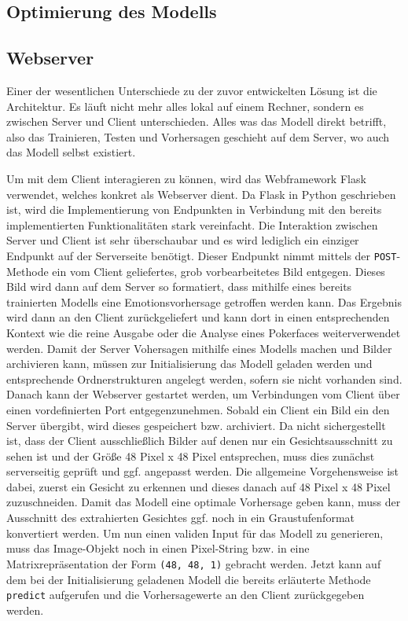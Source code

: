 \documentclass[12pt, a4paper]{report}
\begin{document}
\subsection{Optimierung des Modells}

\subsection{Webserver}
Einer der wesentlichen Unterschiede zu der zuvor entwickelten Lösung ist die Architektur. Es läuft nicht mehr alles lokal auf einem Rechner, sondern es zwischen Server und Client unterschieden. Alles was das Modell direkt betrifft, also das Trainieren, Testen und Vorhersagen geschieht auf dem Server, wo auch das Modell selbst existiert. 


Um mit dem Client interagieren zu können, wird das Webframework Flask verwendet, welches konkret als Webserver dient. Da Flask in Python geschrieben ist, wird die Implementierung von Endpunkten in Verbindung mit den bereits implementierten Funktionalitäten stark vereinfacht.\newline
Die Interaktion zwischen Server und Client ist sehr überschaubar und es wird lediglich ein einziger Endpunkt auf der Serverseite benötigt. Dieser Endpunkt nimmt mittels der \texttt{POST}-Methode ein vom Client geliefertes, grob vorbearbeitetes Bild entgegen. Dieses Bild wird dann auf dem Server so formatiert, dass mithilfe eines bereits trainierten Modells eine Emotionsvorhersage getroffen werden kann. Das Ergebnis wird dann an den Client zurückgeliefert und kann dort in einen entsprechenden Kontext wie die reine Ausgabe oder die Analyse eines Pokerfaces weiterverwendet werden.\newline
Damit der Server Vohersagen mithilfe eines Modells machen und Bilder archivieren kann, müssen zur Initialisierung das Modell geladen werden und entsprechende Ordnerstrukturen angelegt werden, sofern sie nicht vorhanden sind. Danach kann der Webserver gestartet werden, um Verbindungen vom Client über einen vordefinierten Port entgegenzunehmen. Sobald ein Client ein Bild ein den Server übergibt, wird dieses gespeichert bzw. archiviert. Da nicht sichergestellt ist, dass der Client ausschließlich Bilder auf denen nur ein Gesichtsausschnitt zu sehen ist und der Größe  48 Pixel x 48 Pixel entsprechen, muss dies zunächst serverseitig geprüft und ggf. angepasst werden.  
Die allgemeine Vorgehensweise ist dabei, zuerst ein Gesicht zu erkennen und dieses danach auf 48 Pixel x 48 Pixel zuzuschneiden. Damit das Modell eine optimale Vorhersage geben kann, muss der Ausschnitt des extrahierten Gesichtes ggf. noch in ein Graustufenformat konvertiert werden. Um nun einen validen Input für das Modell zu generieren, muss das Image-Objekt noch in einen Pixel-String bzw. in eine Matrixrepräsentation der Form \texttt{(48, 48, 1)} gebracht werden. Jetzt kann auf dem bei der Initialisierung geladenen Modell die bereits erläuterte Methode \texttt{predict} aufgerufen und die Vorhersagewerte an den Client zurückgegeben werden.
\end{document}
